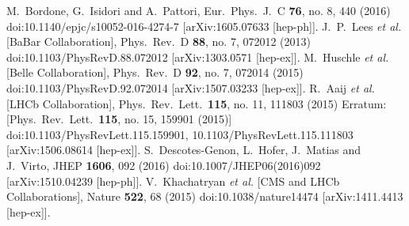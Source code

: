 \documentclass[12pt]{article}
\begin{document}
\begin{enumerate}
\begin{thebibliography}{9}
  M.~Bordone, G.~Isidori and A.~Pattori,
  Eur.\ Phys.\ J.\ C {\bf 76}, no. 8, 440 (2016)
  doi:10.1140/epjc/s10052-016-4274-7
  [arXiv:1605.07633 [hep-ph]].
  J.~P.~Lees {\it et al.} [BaBar Collaboration],
  Phys.\ Rev.\ D {\bf 88}, no. 7, 072012 (2013)
  doi:10.1103/PhysRevD.88.072012
  [arXiv:1303.0571 [hep-ex]].
  M.~Huschle {\it et al.} [Belle Collaboration],
  Phys.\ Rev.\ D {\bf 92}, no. 7, 072014 (2015)
  doi:10.1103/PhysRevD.92.072014
  [arXiv:1507.03233 [hep-ex]].
  R.~Aaij {\it et al.} [LHCb Collaboration],
  Phys.\ Rev.\ Lett.\  {\bf 115}, no. 11, 111803 (2015)
  Erratum: [Phys.\ Rev.\ Lett.\  {\bf 115}, no. 15, 159901 (2015)]
  doi:10.1103/PhysRevLett.115.159901, 10.1103/PhysRevLett.115.111803
  [arXiv:1506.08614 [hep-ex]].
  S.~Descotes-Genon, L.~Hofer, J.~Matias and J.~Virto,
  JHEP {\bf 1606}, 092 (2016)
  doi:10.1007/JHEP06(2016)092
  [arXiv:1510.04239 [hep-ph]].
  V.~Khachatryan {\it et al.} [CMS and LHCb Collaborations],
  Nature {\bf 522}, 68 (2015)
  doi:10.1038/nature14474
  [arXiv:1411.4413 [hep-ex]].
\end{thebibliography}
\end{enumerate}
\end{document}
